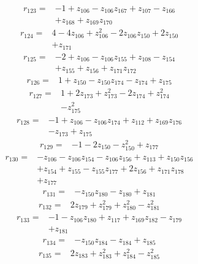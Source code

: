\begin{align*}
r_{123}={}&-1 +z_{106} -z_{106}z_{167} +z_{107} -z_{166}\\
&+z_{168} +z_{169}z_{170}
\end{align*}
\begin{align*}
r_{124}={}&4 -4z_{106} +z_{106}^{2} -2z_{106}z_{150} +2z_{150}\\
&+z_{171}
\end{align*}
\begin{align*}
r_{125}={}&-2 +z_{106} -z_{106}z_{155} +z_{108} -z_{154}\\
&+z_{155} +z_{156} +z_{171}z_{172}
\end{align*}
\begin{align*}
r_{126}={}&1 +z_{150} -z_{150}z_{174} -z_{174} +z_{175}
\end{align*}
\begin{align*}
r_{127}={}&1 +2z_{173} +z_{173}^{2} -2z_{174} +z_{174}^{2}\\
&-z_{175}^{2}
\end{align*}
\begin{align*}
r_{128}={}&-1 +z_{106} -z_{106}z_{174} +z_{112} +z_{169}z_{176}\\
&-z_{173} +z_{175}
\end{align*}
\begin{align*}
r_{129}={}&-1 -2z_{150} -z_{150}^{2} +z_{177}
\end{align*}
\begin{align*}
r_{130}={}&-z_{106} -z_{106}z_{154} -z_{106}z_{156} +z_{113} +z_{150}z_{156}\\
&+z_{154} +z_{155} -z_{155}z_{177} +2z_{156} +z_{171}z_{178}\\
&+z_{177}
\end{align*}
\begin{align*}
r_{131}={}&-z_{150}z_{180} -z_{180} +z_{181}
\end{align*}
\begin{align*}
r_{132}={}&2z_{179} +z_{179}^{2} +z_{180}^{2} -z_{181}^{2}
\end{align*}
\begin{align*}
r_{133}={}&-1 -z_{106}z_{180} +z_{117} +z_{169}z_{182} -z_{179}\\
&+z_{181}
\end{align*}
\begin{align*}
r_{134}={}&-z_{150}z_{184} -z_{184} +z_{185}
\end{align*}
\begin{align*}
r_{135}={}&2z_{183} +z_{183}^{2} +z_{184}^{2} -z_{185}^{2}
\end{align*}
